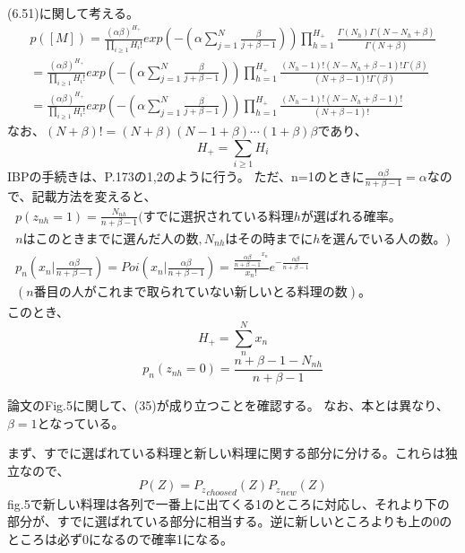 ﻿\documentclass{jsarticle}
\begin{document}
(6.51)に関して考える。
\begin{equation}
\begin{split}
p([M]) = \frac{(\alpha\beta)^{H_+}}{\prod_{i \geq 1}H_i!} exp(-(\alpha \sum_{j = 1}^{N}\frac{\beta}{j + \beta - 1}))　\prod_{h=1}^{H_+}  \frac{\Gamma(N_h)\Gamma(N - N_h + \beta)}{\Gamma(N + \beta) }\\
= \frac{(\alpha\beta)^{H_+}}{\prod_{i \geq 1}H_i!} exp(-(\alpha \sum_{j = 1}^{N}\frac{\beta}{j + \beta - 1}))　\prod_{h=1}^{H_+}  \frac{(N_h - 1)! (N - N_h + \beta - 1)! \Gamma(\beta)}{(N + \beta - 1)!\Gamma(\beta) }\\
= \frac{(\alpha\beta)^{H_+}}{\prod_{i \geq 1}H_i!} exp(-(\alpha \sum_{j = 1}^{N}\frac{\beta}{j + \beta - 1}))　\prod_{h=1}^{H_+}  \frac{(N_h - 1)! (N - N_h + \beta - 1)!}{(N + \beta - 1)! }
\end{split}
\end{equation}
なお、$(N+\beta)! = (N+\beta)(N-1+\beta)\cdots (1+\beta)\beta$であり、
\begin{equation}
H_{+} = \sum_{i \geq 1} H_i
\end{equation}
IBPの手続きは、P.173の1,2のように行う。
ただ、n=1のときに$\frac{\alpha\beta}{n+\beta-1}=\alpha$なので、記載方法を変えると、
\begin{equation}
\begin{split}
p(z_{nh}=1) = \frac{N_{nh}}{n + \beta - 1}(すでに選択されている料理hが選ばれる確率。\\
nはこのときまでに選んだ人の数,N_{nh}はその時までにhを選んでいる人の数。)\\
p_n(x_n | \frac{\alpha\beta}{n + \beta -1}) = Poi(x_n | \frac{\alpha\beta}{n + \beta -1}) = \frac{{\frac{\alpha\beta}{n + \beta -1}}^{x_n}}{x_n !}e^{-\frac{\alpha\beta}{n + \beta -1}}\\
(n番目の人がこれまで取られていない新しいとる料理の数)。
\end{split}
\end{equation}
このとき、
\begin{equation}
H_{+} = \sum_n^N x_n
\end{equation}
\begin{equation}
p_n(z_{nh}=0) = \frac{n + \beta - 1 - N_{nh}}{n + \beta - 1}
\end{equation}

論文のFig.5に関して、(35)が成り立つことを確認する。
なお、本とは異なり、$\beta = 1$となっている。

まず、すでに選ばれている料理と新しい料理に関する部分に分ける。これらは独立なので、
\begin{equation}
P(Z) = {P_z}_{choosed}(Z){P_z}_{new}(Z)
\end{equation}
fig.5で新しい料理は各列で一番上に出てくる1のところに対応し、それより下の部分が、すでに選ばれている部分に相当する。逆に新しいところよりも上の0のところは必ず0になるので確率1になる。
\end{document}
